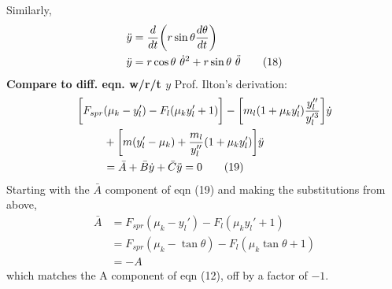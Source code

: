 \documentclass[12pt]{article}
\begin{document}
Similarly,
\begin{align}
    \ddot{y} & = \frac{d}{dt}\biggl( r \sin{\theta} \frac{d\theta}{dt}\biggr) \notag \\
    \ddot{y} & = r \cos{\theta} \ \dot{\theta}^2 + r \sin{\theta} \ \ddot{\theta} \tag{18}
\end{align}
\newline
\noindent \textbf{Compare to diff. eqn. w/r/t $y$}
\newline
Prof. Ilton's derivation:
\begin{align}
    \biggl[ F_{spr} & (\mu_k - y_l') - F_l(\mu_k y_l' + 1) \biggr] - \biggl[ m_l (1 + \mu_k y_l') \frac{y_l''}{y_l'^3} \biggr] \dot{y} \notag \\
    & + \biggl[ m (y_l' - \mu_k) + \frac{m_l}{y_l''} (1 + \mu_k y_l') \biggr] \ddot{y} \notag \\
    & = \bar A + \bar B \dot{y} + \bar C \ddot{y} = 0 \tag{19}
\end{align}
\newline
Starting with the $\bar A$ component of eqn (19) and making the substitutions from above,
\begin{align*}
    \bar A & = F_{spr} (\mu_k - y_l') - F_l(\mu_k y_l' + 1) \\
    & = F_{spr} (\mu_k - \tan{\theta}) - F_l(\mu_k \tan{\theta} + 1) \\
    & = -A
\end{align*}
which matches the A component of eqn (12), off by a factor of $-1$.
\end{document}
